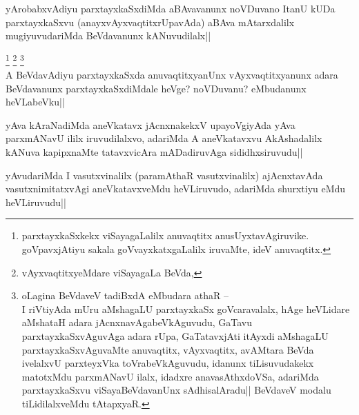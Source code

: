 
\begin{artha} 
yArobabxvAdiyu parxtayxkaSxdiMda aBAvavanunx noVDuvano ItanU kUDa 
parxtayxkaSxvu (anayxvAyxvaqtitxrUpavAda) aBAva mAtarxdalilx 
mugiyuvudariMda BeVdavanunx kANuvudilalx||
\end{artha}


\begin{artha}
\footnote[1]{parxtayxkaSxkekx viSayagaLalilx anuvaqtitx 
anusUyxtavAgiruvike. goVpavxjAtiyu sakala goVvayxkatxgaLalilx 
iruvaMte, ideV anuvaqtitx.}
\footnote[2]{vAyxvaqtitxyeMdare viSayagaLa BeVda,}
\footnote[3]{oLagina BeVdaveV tadiBxdA eMbudara athaR --\\ I riVtiyAda 
mUru aMshagaLU parxtayxkaSx goVcaravalalx, hAge heVLidare aMshataH 
adara jAcnxnavAgabeVkAguvudu, GaTavu parxtayxkaSxvAguvAga adara rUpa, 
GaTatavxjAti itAyxdi aMshagaLU parxtayxkaSxvAguvaMte anuvaqtitx, 
vAyxvaqtitx, avAMtara BeVda ivelalxvU parxteyxVka toVrabeVkAguvudu, 
idanunx tiLisuvudakekx matotxMdu parxmANavU ilalx, idadxre 
anavasAthxdoVSa, adariMda parxtayxkaSxvu viSayaBeVdavanUnx 
sAdhisalAradu|| BeVdaveV modalu tiLidilalxveMdu tAtapxyaR.}\\
A BeVdavAdiyu parxtayxkaSxda anuvaqtitxyanUnx vAyxvaqtitxyanunx adara 
BeVdavanunx parxtayxkaSxdiMdale heVge? noVDuvanu? eMbudanunx 
heVLabeVku||
\end{artha}


\begin{artha} 
yAva kAraNadiMda aneVkatavx jAcnxnakekxV upayoVgiyAda yAva parxmANavU 
ililx iruvudilalxvo, adariMda A aneVkatavxvu AkAshadalilx kANuva 
kapipxnaMte tatavxvicAra mADadiruvAga sididhxsiruvudu||
\end{artha}

\begin{artha} 
yAvudariMda I vasutxvinalilx (paramAthaR vasutxvinalilx) ajAcnxtavAda 
vasutxnimitatxvAgi aneVkatavxveMdu heVLiruvudo, adariMda shurxtiyu 
\stext eMdu heVLiruvudu||
\end{artha}

